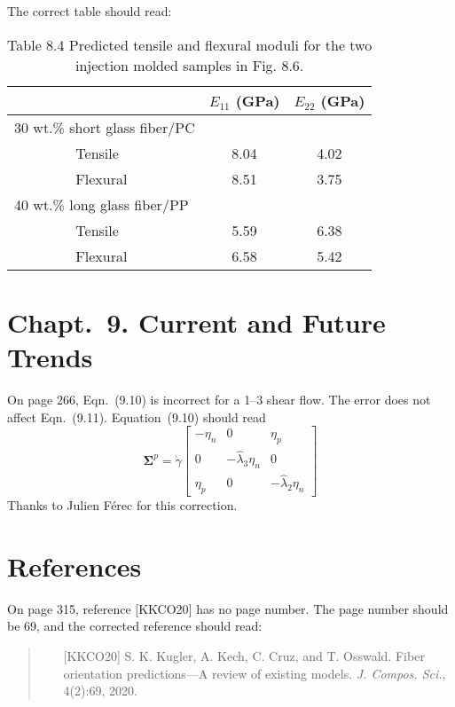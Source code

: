 \documentclass[11pt]{article}
\begin{document}
\noindent The correct table should read:
\begin{table}[h]
    \centering
     \caption*{Table 8.4 Predicted tensile and flexural moduli for the two injection molded samples in Fig. 8.6.}
         \begin{tabular}{l|c|c}
                  & $E_{11}$ (GPa)     & $E_{22}$ (GPa)   \\ 
                  \hline
                  30 wt.\% short glass fiber/PC & & \\
                  ~~~~~~~~ Tensile   & 8.04  & 4.02 \\
                  ~~~~~~~~ Flexural  & 8.51 & 3.75 \\
                  \hline
                  40 wt.\% long glass fiber/PP & & \\
                  ~~~~~~~~ Tensile   & 5.59  & 6.38 \\
                  ~~~~~~~~ Flexural  & 6.58 & 5.42 
           \end{tabular}
    \end{table}
    

\section*{Chapt.\ 9. Current and Future Trends}

On page 266, Eqn.~(9.10) is incorrect for a 1--3 shear flow.  The error does not affect Eqn.~(9.11).  Equation~(9.10) should read
\begin{equation*}
       \boldsymbol{\Sigma}^p = \dot{\gamma} 
                            \left[ \begin{array}{ccc}
                                  -\eta_n  & 0 & \eta_p \\
                                  0   & -\hat{\lambda}_3 \eta_n &0 \\
                                  \eta_p & 0 & -\hat{\lambda}_2 \eta_n
                            \end{array} \right]
\end{equation*}
Thanks to Julien F\'erec for this correction.
    
\section*{References}

On page 315, reference [KKCO20] has no page number.  The page number should be 69, and the corrected reference should read:
\begin{quote}
\begin{itemize}
\item[{[KKCO20]}] S. K. Kugler, A. Kech, C. Cruz, and T. Osswald. Fiber orientation predictions—A review of existing models. \textit{J. Compos. Sci.}, 4(2):69, 2020.
\end{itemize}
\end{quote}
\end{document}
